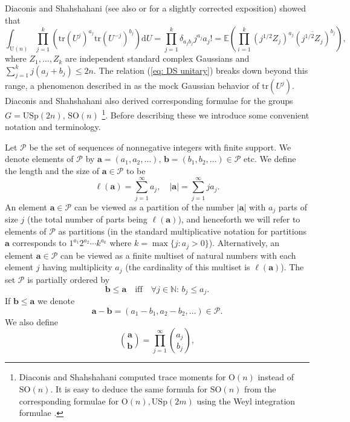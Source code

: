 \documentclass[alphabetic, 
        colorlinks,
        linkcolor=red,  citecolor=blue,
        backref
]{amsart}
\numberwithin{equation}{section}
\theoremstyle{definition}
\newcommand{\USp}{{\mathrm{USp}}}
\newcommand{\U}{{\mathrm{U}}}
\renewcommand{\O}{{\mathrm{O}}}
\newcommand{\SO}{{\mathrm{SO}}}
\newcommand{\tr}{{\mathrm{tr}}}
\begin{document}
Diaconis and Shahshahani \cite{DiSh94} (see also \cite{DiEv01} or \cite[\S 3.3]{Mec19} for a slightly corrected exposition) showed that
\begin{equation}\label{eq: DS unitary}\int_{\U(n)}\prod_{j=1}^k\left(\tr(U^j)^{a_j}\tr(U^{-j})^{b_j}\right)\mathrm dU=\prod_{j=1}^k\delta_{a_jb_j}j^{a_j}a_j!=\mathbb E\left(\prod_{i=1}^k(j^{1/2}Z_j)^{a_j}(\overline{j^{1/2}Z_j})^{b_j}\right),\end{equation} where $Z_1,\ldots,Z_k$ are independent standard complex Gaussians and $\sum_{j=1}^kj(a_j+b_j)\le 2n$. The relation (\ref{eq: DS unitary}) breaks down beyond this range, a phenomenon described in \cite{HuRu03} as the mock Gaussian behavior of $\tr(U^j)$. Diaconis and Shahshahani also derived corresponding formulae for the groups $G=\USp(2n),\,\SO(n)$ \footnote{Diaconis and Shahshahani computed trace moments for $\O(n)$ instead of $\SO(n)$. It is easy to deduce the same formula for $\SO(n)$ from the corresponding formulae for $\O(n),\USp(2m)$ using the Weyl integration formulae \cite[Theorem 3.5]{Mec19}.}. 
Before describing these we introduce some convenient notation and terminology.

Let $\mathcal P$ be the set of sequences of nonnegative integers with finite support. We denote elements of $\mathcal P$ by $\mathbf a = (a_1,a_2,\ldots),\,\mathbf b = (b_1,b_2,\ldots)\in\mathcal P$ etc. We define the length and the size of $\mathbf a\in\mathcal P$ to be
$$\ell(\mathbf a)=\sum_{j=1}^\infty a_j,\quad |\mathbf a|=\sum_{j=1}^\infty ja_j.$$
An element $\mathbf a\in\mathcal P$ can be viewed as a partition of the number $|\mathbf a|$ with $a_j$ parts of size $j$ (the total number of parts being $\ell(\mathbf a)$), and henceforth we will refer to elements of $\mathcal P$ as partitions (in the standard multiplicative notation for partitions $\mathbf a$ corresponds to $1^{a_1}2^{a_2}\cdots k^{a_k}$ where $k=\max\{j:a_j> 0\}$). Alternatively, an element $\mathbf a\in\mathcal P$ can be viewed as a finite multiset of natural numbers with each element $j$ having multiplicity $a_j$ (the cardinality of this multiset is $\ell(\mathbf a)$).
The set $\mathcal P$ is partially ordered by $$\mathbf b\le\mathbf a\quad\mbox{iff}\quad \forall j\in\mathbb N:\, b_j\le a_j.$$ If $\mathbf b\le\mathbf a$ we denote
$$\mathbf a-\mathbf b=(a_1-b_1,a_2-b_2,\ldots)\in\mathcal P.$$ 
We also define
$${\mathbf a\choose\mathbf b}=\prod_{j=1}^\infty{a_j\choose b_j},$$ 
\end{document}
